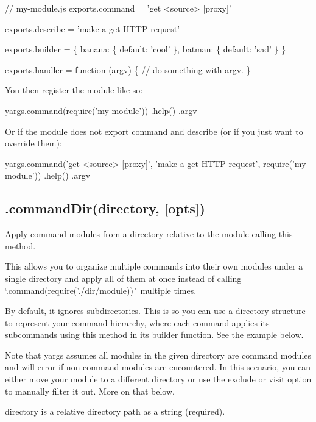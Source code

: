 \begin{DoxyCode}
// my-module.js
exports.command = 'get <source> [proxy]'

exports.describe = 'make a get HTTP request'

exports.builder = \{
  banana: \{
    default: 'cool'
  \},
  batman: \{
    default: 'sad'
  \}
\}

exports.handler = function (argv) \{
  // do something with argv.
\}
\end{DoxyCode}


You then register the module like so\+:


\begin{DoxyCode}
yargs.command(require('my-module'))
  .help()
  .argv
\end{DoxyCode}


Or if the module does not export {\ttfamily command} and {\ttfamily describe} (or if you just want to override them)\+:


\begin{DoxyCode}
yargs.command('get <source> [proxy]', 'make a get HTTP request', require('my-module'))
  .help()
  .argv
\end{DoxyCode}


\subsection*{.command\+Dir(directory, \mbox{[}opts\mbox{]}) }

Apply command modules from a directory relative to the module calling this method.

This allows you to organize multiple commands into their own modules under a single directory and apply all of them at once instead of calling `.command(require('./dir/module\textquotesingle{}))\`{} multiple times.

By default, it ignores subdirectories. This is so you can use a directory structure to represent your command hierarchy, where each command applies its subcommands using this method in its builder function. See the example below.

Note that yargs assumes all modules in the given directory are command modules and will error if non-\/command modules are encountered. In this scenario, you can either move your module to a different directory or use the {\ttfamily exclude} or {\ttfamily visit} option to manually filter it out. More on that below.

{\ttfamily directory} is a relative directory path as a string (required).

